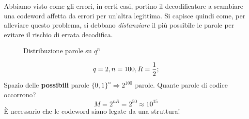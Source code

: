 Abbiamo visto come gli errori, in certi casi, portino il decodificatore a scambiare una codeword affetta da errori per un'altra legittima. Si capisce quindi come, per alleviare questo problema, si debbano \textit{distanziare} il più possibile le parole  per evitare il rischio di errata decodifica.

\begin{figure}[H]
    \centering
    
    \caption{Distribuzione parole su $q^n$}
    \label{fig:placeholder}
\end{figure}

\begin{esempio}{}
\[q=2, \space n=100, \space R=\frac{1}{2};\]
Spazio delle \textbf{possibili} parole $\{0,1\}^n \Rightarrow 2^{100} \text{ parole}$.
Quante parole di codice occorrono?
\[M = 2^{nR}= 2^{50} \approx 10^{15}\]
È necessario che le codeword siano legate da una struttura!
\end{esempio}
